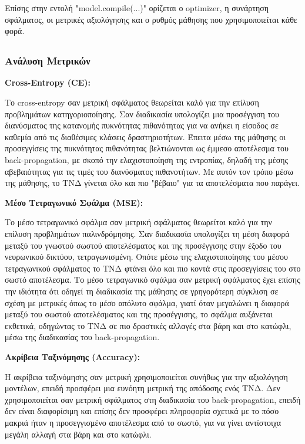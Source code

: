 \documentclass[12pt,a4paper]{article}
\begin{document}
Επίσης στην εντολή "model.compile(...)" ορίζεται ο optimizer, η συνάρτηση σφάλματος, οι μετρικές αξιολόγησης και ο ρυθμός μάθησης που χρησιμοποιείται κάθε φορά.

\subsection{}

\subsubsection{Ανάλυση Μετρικών}
\label{Ανάλυση Μετρικών}

\textbf{Cross-Entropy (CE):}

Το cross-entropy σαν μετρική σφάλματος θεωρείται καλό για την επίλυση προβλημάτων κατηγοριοποίησης. Σαν διαδικασία υπολογίζει μια προσέγγιση του διανύσματος της κατανομής πυκνότητας πιθανότητας για να ανήκει η είσοδος σε καθεμία από τις διαθέσιμες κλάσεις δραστηριοτήτων. Έπειτα μέσω της μάθησης οι προσεγγίσεις της πυκνότητας πιθανότητας βελτιώνονται ως έμμεσο αποτέλεσμα του back-propagation, με σκοπό την ελαχιστοποίηση της εντροπίας, δηλαδή της μέσης αβεβαιότητας για τις τιμές του διανύσματος πιθανοτήτων. Με αυτόν τον τρόπο μέσω της μάθησης, το ΤΝΔ γίνεται όλο και πιο "βέβαιο" για τα αποτελέσματα που παράγει.

\textbf{Μέσο Τετραγωνικό Σφάλμα (MSE):}

Το μέσο τετραγωνικό σφάλμα σαν μετρική σφάλματος θεωρείται καλό για την επίλυση προβλημάτων παλινδρόμησης. Σαν διαδικασία υπολογίζει τη μέση διαφορά μεταξύ του γνωστού σωστού αποτελέσματος και της προσέγγισης στην έξοδο του νευρωνικού δικτύου, τετραγωνισμένη. Οπότε μέσω της ελαχιστοποίησης του μέσου τετραγωνικού σφάλματος το ΤΝΔ φτάνει όλο και πιο κοντά στις προσεγγίσεις του στο σωστό αποτέλεσμα. Το μέσο τετραγωνικό σφάλμα σαν μετρική σφάλματος έχει επίσης την ιδιότητα ότι οδηγεί τη διαδικασία της μάθησης σε γρηγορότερη σύγκλιση σε σχέση με μετρικές όπως το μέσο απόλυτο σφάλμα, γιατί όταν μεγαλώνει η διαφορά μεταξύ του σωστού αποτελέσματος και της προσέγγισης, το σφάλμα αυξάνεται εκθετικά, οδηγώντας το ΤΝΔ σε πιο δραστικές αλλαγές στα βάρη και στο κατώφλι, μέσω της διαδικασίας του back-propagation.

\textbf{Ακρίβεια Ταξινόμησης (Accuracy):}

Η ακρίβεια ταξινόμησης σαν μετρική χρησιμοποιείται συνήθως για την αξιολόγηση μοντέλων, επειδή προσφέρει μια ευνόητη μετρική της απόδοσης ενός ΤΝΔ. Δεν χρησιμοποιείται σαν μετρική σφάλματος στη διαδικασία του back-propagation, επειδή δεν είναι διαφορίσιμη και επίσης δεν προσφέρει πληροφορία σχετικά με το πόσο μακριά ήταν η προσεγγισμένο αποτέλεσμα από το σωστό, για να γίνει αντίστοιχα μεγάλη αλλαγή στα βάρη και στο κατώφλι.
\end{document}
